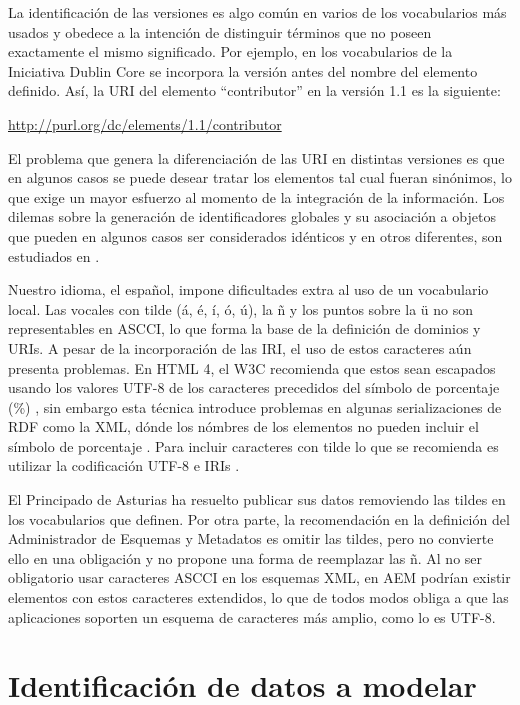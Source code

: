 \documentclass[letterpaper,titlepage]{article}
\begin{document}
La identificación de las versiones es algo común en varios de los
vocabularios más usados y obedece a la intención de distinguir
términos que no poseen exactamente el mismo significado. Por ejemplo,
en los vocabularios de la Iniciativa Dublin Core se incorpora la
versión antes del nombre del elemento definido. Así, la URI del
elemento ``contributor'' en la versión 1.1 es la siguiente:

\begin{flushleft}
  \url{http://purl.org/dc/elements/1.1/contributor}
\end{flushleft}

El problema que genera la diferenciación de las URI en distintas
versiones es que en algunos casos se puede desear tratar los elementos
tal cual fueran sinónimos, lo que exige un mayor esfuerzo al momento
de la integración de la información. Los dilemas sobre la generación
de identificadores globales y su asociación a objetos que pueden en
algunos casos ser considerados idénticos y en otros diferentes, son
estudiados en \cite{uri-mitos}.

Nuestro idioma, el español, impone dificultades extra al uso de un
vocabulario local. Las vocales con tilde (á, é, í, ó, ú), la ñ y los
puntos sobre la ü no son representables en ASCCI, lo que forma la base
de la definición de dominios y URIs. A pesar de la incorporación de
las IRI, el uso de estos caracteres aún presenta problemas. En HTML 4,
el W3C recomienda que estos sean escapados usando los valores UTF-8 de
los caracteres precedidos del
símbolo de porcentaje (\%) \cite{scaped-utf8}, sin embargo esta
técnica introduce problemas en algunas serializaciones de RDF como la
XML, dónde los nómbres de los elementos no pueden incluir el símbolo
de porcentaje \cite{i18n-sw}. Para incluir caracteres con tilde lo
que se recomienda es utilizar la codificación UTF-8 e IRIs
\cite{utf8-iri}.

El Principado de Asturias ha resuelto publicar sus datos removiendo
las tildes en los vocabularios que definen. Por otra parte, la
recomendación en la definición del Administrador de Esquemas y
Metadatos es omitir las tildes, pero no convierte ello en una
obligación y no propone una forma de reemplazar las ñ. Al no ser
obligatorio usar caracteres ASCCI en los esquemas XML, en AEM podrían
existir elementos con estos caracteres extendidos, lo que de todos
modos obliga a que las aplicaciones soporten un esquema de caracteres
más amplio, como lo es UTF-8.

\section{Identificación de datos a modelar}
\label{esquema}
\end{document}
